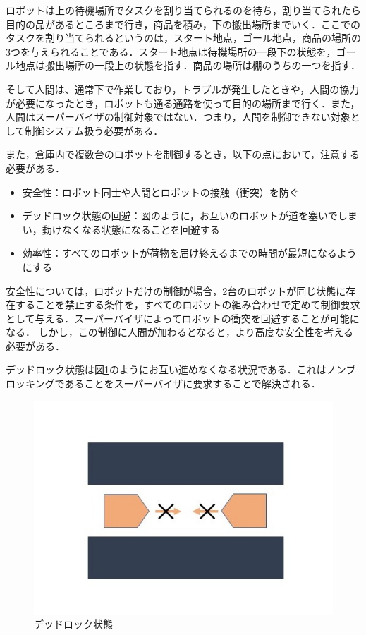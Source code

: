 ロボットは上の待機場所でタスクを割り当てられるのを待ち，割り当てられたら目的の品があるところまで行き，商品を積み，下の搬出場所までいく．ここでのタスクを割り当てられるというのは，スタート地点，ゴール地点，商品の場所の3つを与えられることである．スタート地点は待機場所の一段下の状態を，ゴール地点は搬出場所の一段上の状態を指す．商品の場所は棚のうちの一つを指す．

そして人間は、通常下で作業しており，トラブルが発生したときや，人間の協力が必要になったとき，ロボットも通る通路を使って目的の場所まで行く．また，人間はスーパーバイザの制御対象ではない．つまり，人間を制御できない対象として制御システム扱う必要がある．

また，倉庫内で複数台のロボットを制御するとき，以下の点において，注意する必要がある．
\begin{itemize}
    \item 安全性：ロボット同士や人間とロボットの接触（衝突）を防ぐ
    \item デッドロック状態の回避：図のように，お互いのロボットが道を塞いでしまい，動けなくなる状態になることを回避する
    \item 効率性：すべてのロボットが荷物を届け終えるまでの時間が最短になるようにする
\end{itemize}
安全性については，ロボットだけの制御が場合，2台のロボットが同じ状態に存在することを禁止する条件を，すべてのロボットの組み合わせで定めて制御要求として与える．スーパーバイザによってロボットの衝突を回避することが可能になる．
しかし，この制御に人間が加わるとなると，より高度な安全性を考える必要がある．

デッドロック状態は図\ref{fig:Dead_Lock}のようにお互い進めなくなる状況である．これはノンブロッキングであることをスーパーバイザに要求することで解決される．

\begin{figure}[h]
    \centering
    \includegraphics[scale=0.5]{figures/Dead_Lock.jpg}
    \caption{デッドロック状態}
    \label{fig:Dead_Lock}
\end{figure}


